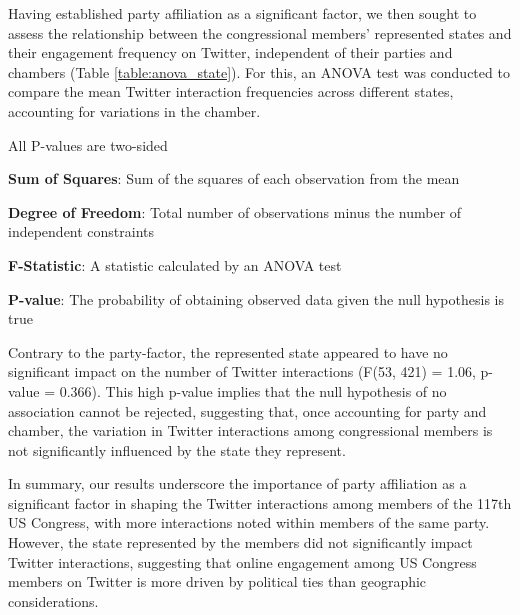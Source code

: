 \documentclass[11pt]{article}
\begin{document}
Having established party affiliation as a significant factor, we then sought to assess the relationship between the congressional members' represented states and their engagement frequency on Twitter, independent of their parties and chambers (Table {}\ref{table:anova_state}). For this, an ANOVA test was conducted to compare the mean Twitter interaction frequencies across different states, accounting for variations in the chamber.

\begin{table}[h]
\caption{ANOVA Test of Association Between State and Twitter Interactions}
\label{table:anova_state}
\begin{threeparttable}
\renewcommand{\TPTminimum}{\linewidth}
\begin{tablenotes}
\footnotesize
\item All P-values are two-sided
\item \textbf{Sum of Squares}: Sum of the squares of each observation from the mean
\item \textbf{Degree of Freedom}: Total number of observations minus the number of independent constraints
\item \textbf{F-Statistic}: A statistic calculated by an ANOVA test
\item \textbf{P-value}: The probability of obtaining observed data given the null hypothesis is true
\end{tablenotes}
\end{threeparttable}
\end{table}


Contrary to the party-factor, the represented state appeared to have no significant impact on the number of Twitter interactions (F(53, 421) = 1.06, p-value = 0.366). This high p-value implies that the null hypothesis of no association cannot be rejected, suggesting that, once accounting for party and chamber, the variation in Twitter interactions among congressional members is not significantly influenced by the state they represent.

In summary, our results underscore the importance of party affiliation as a significant factor in shaping the Twitter interactions among members of the 117th US Congress, with more interactions noted within members of the same party. However, the state represented by the members did not significantly impact Twitter interactions, suggesting that online engagement among US Congress members on Twitter is more driven by political ties than geographic considerations.
\end{document}
